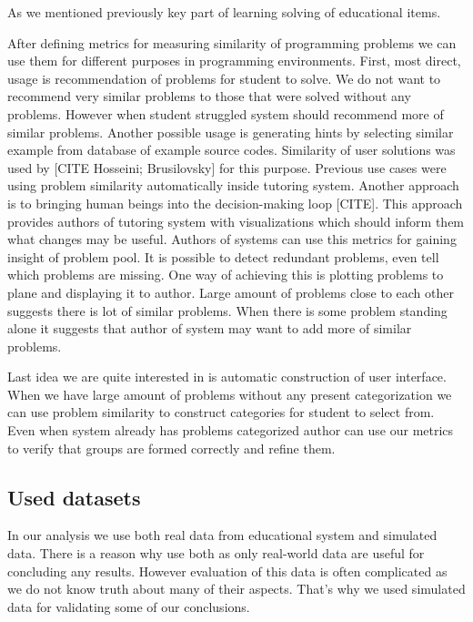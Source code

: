 \documentclass[
  digital, %
  table,   %
  nolof,     %
  nolot,     %
  nocover
]{fithesis3}
\begin{document}
As we mentioned previously key part of learning solving of educational
items.

After defining metrics for measuring similarity of programming problems we can use them for different purposes in programming environments. First, most direct, usage is recommendation of problems for
student to solve. We do not want to recommend very similar problems
to those that were solved without any problems. However when student struggled system should recommend more of similar problems.
Another possible usage is generating hints by selecting similar
example from database of example source codes. Similarity of user
solutions was used by [CITE Hosseini; Brusilovsky] for this purpose.
Previous use cases were using problem similarity automatically
inside tutoring system. Another approach is to bringing human beings
into the decision-making loop [CITE]. This approach provides authors of
tutoring system with visualizations which should inform them what
changes may be useful.
Authors of systems can use this metrics for gaining insight of problem pool. It is possible to detect redundant problems, even tell which
problems are missing. One way of achieving this is plotting problems
to plane and displaying it to author. Large amount of problems close to each other suggests there is lot of similar problems. When there is
some problem standing alone it suggests that author of system may
want to add more of similar problems.

Last idea we are quite interested in is automatic construction of
user interface. When we have large amount of problems without any
present categorization we can use problem similarity to construct
categories for student to select from. Even when system already has
problems categorized author can use our metrics to verify that groups
are formed correctly and refine them.

\subsection{Used datasets}\label{used-datasets}



In our analysis we use both real data from educational system and
simulated data. There is a reason why use both as only real-world data
are useful for concluding any results. However evaluation of this data
is often complicated as we do not know truth about many of their
aspects. That's why we used simulated data for validating some of our
conclusions.
\end{document}
